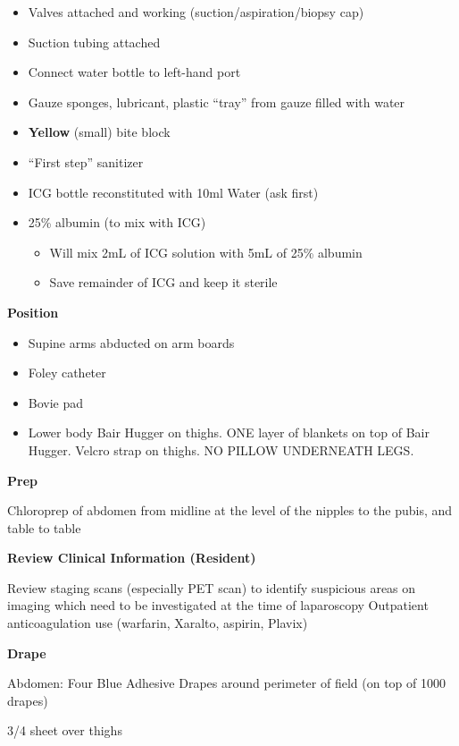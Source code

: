 \documentclass[
  letterpaper,
]{scrbook}
\providecommand{\tightlist}{%
  \setlength{\itemsep}{0pt}\setlength{\parskip}{0pt}}
\begin{document}
\begin{itemize}
\tightlist
\item
  Valves attached and working (suction/aspiration/biopsy cap)
\item
  Suction tubing attached
\item
  Connect water bottle to left-hand port
\item
  Gauze sponges, lubricant, plastic ``tray'' from gauze filled with
  water
\item
  \textbf{Yellow} (small) bite block
\item
  ``First step'' sanitizer
\item
  ICG bottle reconstituted with 10ml Water (ask first)
\item
  25\% albumin (to mix with ICG)

  \begin{itemize}
  \tightlist
  \item
    Will mix 2mL of ICG solution with 5mL of 25\% albumin
  \item
    Save remainder of ICG and keep it sterile
  \end{itemize}
\end{itemize}

\textbf{Position}

\begin{itemize}
\tightlist
\item
  Supine arms abducted on arm boards
\item
  Foley catheter
\item
  Bovie pad
\item
  Lower body Bair Hugger on thighs. ONE layer of blankets on top of Bair
  Hugger. Velcro strap on thighs. NO PILLOW UNDERNEATH LEGS.
\end{itemize}

\textbf{Prep}

Chloroprep of abdomen from midline at the level of the nipples to the
pubis, and table to table

\textbf{Review Clinical Information (Resident)}

Review staging scans (especially PET scan) to identify suspicious areas
on imaging which need to be investigated at the time of laparoscopy
Outpatient anticoagulation use (warfarin, Xaralto, aspirin, Plavix)

\textbf{Drape}

Abdomen: Four Blue Adhesive Drapes around perimeter of field (on top of
1000 drapes)

3/4 sheet over thighs
\end{document}
